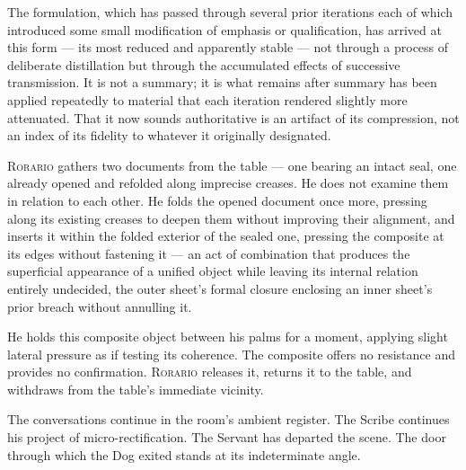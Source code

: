 \documentclass[12pt, oneside]{article}
\newenvironment{action}{%
  \vspace{0.6em}%
  \noindent\ignorespaces%
}{%
  \par\vspace{0.6em}%
}
\begin{document}
\begin{action}
The formulation, which has passed through several prior iterations each of which introduced some small modification of emphasis or qualification, has arrived at this form --- its most reduced and apparently stable --- not through a process of deliberate distillation but through the accumulated effects of successive transmission. It is not a summary; it is what remains after summary has been applied repeatedly to material that each iteration rendered slightly more attenuated. That it now sounds authoritative is an artifact of its compression, not an index of its fidelity to whatever it originally designated.

\textsc{Rorario} gathers two documents from the table --- one bearing an intact seal, one already opened and refolded along imprecise creases. He does not examine them in relation to each other. He folds the opened document once more, pressing along its existing creases to deepen them without improving their alignment, and inserts it within the folded exterior of the sealed one, pressing the composite at its edges without fastening it --- an act of combination that produces the superficial appearance of a unified object while leaving its internal relation entirely undecided, the outer sheet's formal closure enclosing an inner sheet's prior breach without annulling it.

He holds this composite object between his palms for a moment, applying slight lateral pressure as if testing its coherence. The composite offers no resistance and provides no confirmation. \textsc{Rorario} releases it, returns it to the table, and withdraws from the table's immediate vicinity.

The conversations continue in the room's ambient register. The Scribe continues his project of micro-rectification. The Servant has departed the scene. The door through which the Dog exited stands at its indeterminate angle.
\end{action}
\end{document}

